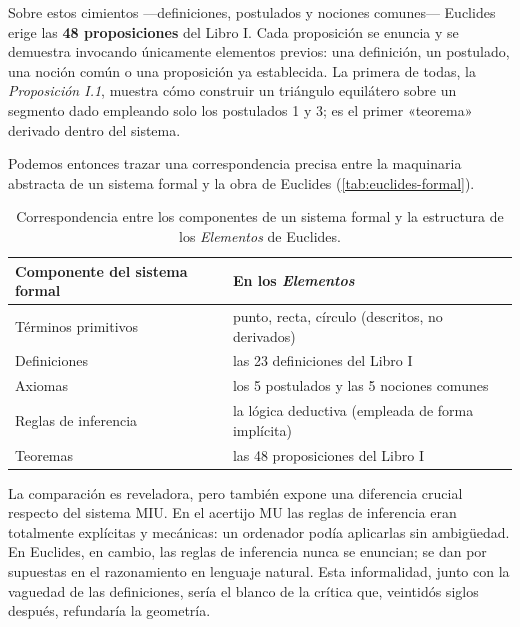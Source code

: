Sobre estos cimientos —definiciones, postulados y nociones comunes— Euclides erige las \textbf{48 proposiciones} del
Libro I. Cada proposición se enuncia y se demuestra invocando únicamente elementos previos: una definición, un
postulado, una noción común o una proposición ya establecida. La primera de todas, la \emph{Proposición I.1}, muestra
cómo construir un triángulo equilátero sobre un segmento dado empleando solo los postulados 1 y 3; es el primer
«teorema» derivado dentro del sistema.

Podemos entonces trazar una correspondencia precisa entre la maquinaria abstracta de un sistema formal y la obra de
Euclides (\autoref{tab:euclides-formal}).

\begin{table}[h!]
    \centering
    \begin{tabular}{@{}ll@{}}
        \toprule
        \textbf{Componente del sistema formal} & \textbf{En los \emph{Elementos}}                  \\
        \midrule
        Términos primitivos                    & punto, recta, círculo (descritos, no derivados)   \\
        Definiciones                           & las 23 definiciones del Libro I                   \\
        Axiomas                                & los 5 postulados y las 5 nociones comunes         \\
        Reglas de inferencia                   & la lógica deductiva (empleada de forma implícita) \\
        Teoremas                               & las 48 proposiciones del Libro I                  \\
        \bottomrule
    \end{tabular}
    \caption{Correspondencia entre los componentes de un sistema formal y la estructura de los \emph{Elementos} de
        Euclides.}
    \label{tab:euclides-formal}
\end{table}

La comparación es reveladora, pero también expone una diferencia crucial respecto del sistema MIU. En el acertijo MU
las reglas de inferencia eran totalmente explícitas y mecánicas: un ordenador podía aplicarlas sin ambigüedad. En
Euclides, en cambio, las reglas de inferencia nunca se enuncian; se dan por supuestas en el razonamiento en lenguaje
natural. Esta informalidad, junto con la vaguedad de las definiciones, sería el blanco de la crítica que, veintidós
siglos después, refundaría la geometría.

